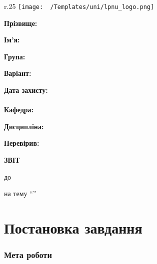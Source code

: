 \Margins
\begin{wrapfigure}[3]{r}{.25\textwidth}
\texttt{[image: ~/Templates/uni/lpnu\_logo.png]} %
\end{wrapfigure}

\noindent\textbf{Прізвище:} \Lname

\noindent\textbf{Ім'я:} \Fname

\noindent\textbf{Група:} \Group

\noindent\textbf{Варіант:} \Variant

\noindent\textbf{Дата захисту:} \Date
\\\\
\noindent\textbf{Кафедра:} \Department

\noindent\textbf{Дисципліна:} \Discipline

\noindent\textbf{Перевірив:} \Reviser


\begin{center}
	\textbf{ЗВІТ}

	до \Work

	на тему ``\Topic''
\end{center}
\section*{Постановка завдання}
\subsubsection*{Мета роботи}
